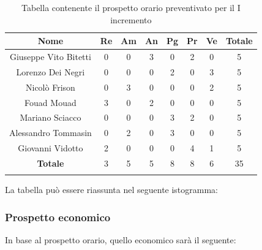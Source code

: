 			\begin{longtable}{|c|c|c|c|c|c|c|c}
				\hline
				\rowcolor{lighter-grayer}
				\textbf{Nome} & \textbf{Re} & \textbf{Am} & \textbf{An} & \textbf{Pg}  & \textbf{Pr}   & \textbf{Ve} & \textbf{Totale} \\
				\hline
				\endfirsthead
				\hline
				Giuseppe Vito Bitetti & 0 & 0 & 3 & 0 & 2 & 0 & 5\\
				\hline
				\hline
				Lorenzo Dei Negri & 0 & 0 & 0 & 2 & 0 & 3 & 5\\
				\hline
				\hline
				Nicolò Frison & 0 & 3 & 0 & 0 & 0 & 2 & 5\\
				\hline
				\hline
				Fouad Mouad & 3 & 0 & 2 & 0 & 0 & 0 & 5\\
				\hline
				\hline
				Mariano Sciacco & 0 & 0 & 0 & 3 & 2 & 0 & 5\\
				\hline
				\hline
				Alessandro Tommasin & 0 & 2 & 0 & 3 & 0 & 0 & 5\\
				\hline
				\hline
				Giovanni Vidotto & 2 & 0 & 0 & 0 & 4 & 1 & 5\\
				\hline 
				\textbf{Totale} & 3 &  5 & 5 & 8 & 8 & 6 & 35\\
				\hline 
				
				\caption{Tabella contenente il prospetto orario preventivato per il I incremento}
			\end{longtable}
			\pagebreak	
			
			La tabella può essere riassunta nel seguente istogramma:
			
			
		\subsubsection{Prospetto economico}
			In base al prospetto orario, quello economico sarà il seguente: 
			
